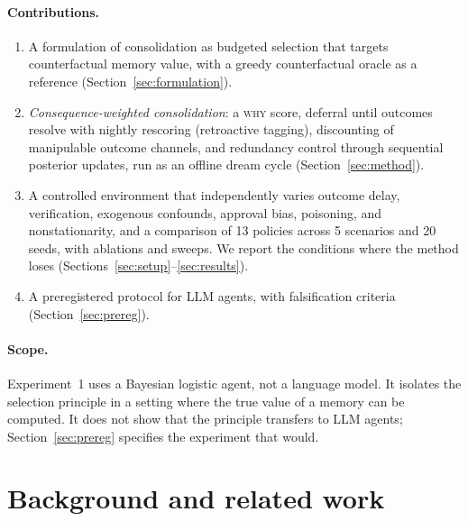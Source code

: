 \documentclass[11pt]{article}
\newcommand{\WHY}{\textsc{why}}
\begin{document}
\paragraph{Contributions.}
\begin{enumerate}
\item A formulation of consolidation as budgeted selection that targets counterfactual memory value, with a greedy counterfactual oracle as a reference (Section~\ref{sec:formulation}).
\item \emph{Consequence-weighted consolidation}: a \WHY{} score, deferral until outcomes resolve with nightly rescoring (retroactive tagging), discounting of manipulable outcome channels, and redundancy control through sequential posterior updates, run as an offline dream cycle (Section~\ref{sec:method}).
\item A controlled environment that independently varies outcome delay, verification, exogenous confounds, approval bias, poisoning, and nonstationarity, and a comparison of 13 policies across 5 scenarios and 20 seeds, with ablations and sweeps. We report the conditions where the method loses (Sections~\ref{sec:setup}--\ref{sec:results}).
\item A preregistered protocol for LLM agents, with falsification criteria (Section~\ref{sec:prereg}).
\end{enumerate}

\paragraph{Scope.} Experiment~1 uses a Bayesian logistic agent, not a language model. It isolates the selection principle in a setting where the true value of a memory can be computed. It does not show that the principle transfers to LLM agents; Section~\ref{sec:prereg} specifies the experiment that would.

\section{Background and related work}
\label{sec:related}
\end{document}
